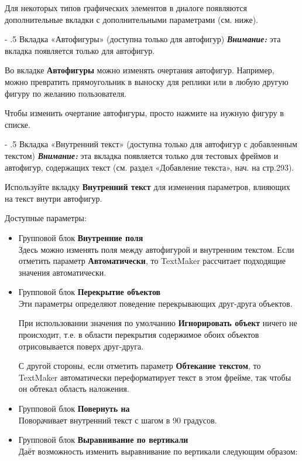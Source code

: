 ﻿\documentclass[a4paper,10pt]{article}
\makeatletter
\renewcommand\paragraph{%
   \@startsection{paragraph}{4}{0mm}%
      {-\baselineskip}%
      {.5\baselineskip}%
      {\normalfont\normalsize\bfseries}}
\makeatother
\begin{document}
Для некоторых типов графических элементов в диалоге появляются дополнительные вкладки с дополнительными параметрами (см. ниже).

\paragraph{Вкладка «Автофигуры» (доступна только для автофигур)}
\textbf{\textit{Внимание:}} эта вкладка появляется только для автофигур.

Во вкладке \textbf{Автофигуры} можно изменять очертания автофигур. Например, можно превратить прямоугольник в выноску для реплики или в любую другую фигуру по желанию пользователя.

Чтобы изменить очертание автофигуры, просто нажмите на нужную фигуру в списке.

\paragraph{Вкладка «Внутренний текст» (доступна только для автофигур с добавленным текстом)}
\textit{\textbf{Внимание:}} эта вкладка появляется только для тестовых фреймов и автофигур, содержащих текст (см. раздел «Добавление текста», нач. на стр.293).

Используйте вкладку \textbf{Внутренний текст} для изменения параметров, влияющих на текст внутри автофигур.

Доступные параметры:

\begin{itemize}
 \item Групповой блок \textbf{Внутренние поля}\\
 Здесь можно изменять поля между автофигурой и внутренним текстом. Если отметить параметр \textbf{Автоматически}, то TextMaker рассчитает подходящие значения автоматически.
 \item Групповой блок \textbf{Перекрытие объектов}\\
 Эти параметры определяют поведение перекрывающих друг-друга объектов. 
 
 При использовании значения по умолчанию \textbf{Игнорировать объект} ничего не происходит, т.е. в области перекрытия содержимое обоих объектов отрисовывается поверх друг-друга.
 
С другой стороны, если отметить параметр \textbf{Обтекание текстом}, то TextMaker автоматически переформатирует текст в этом фрейме, так чтобы он обтекал область наложения.
\item Групповой блок \textbf{Повернуть на}\\
Поворачивает внутренний текст с шагом в 90 градусов.

\item Групповой блок \textbf{Выравнивание по вертикали}\\
Даёт возможность изменить выравнивание по вертикали следующим образом:
\end{itemize}
\end{document}
